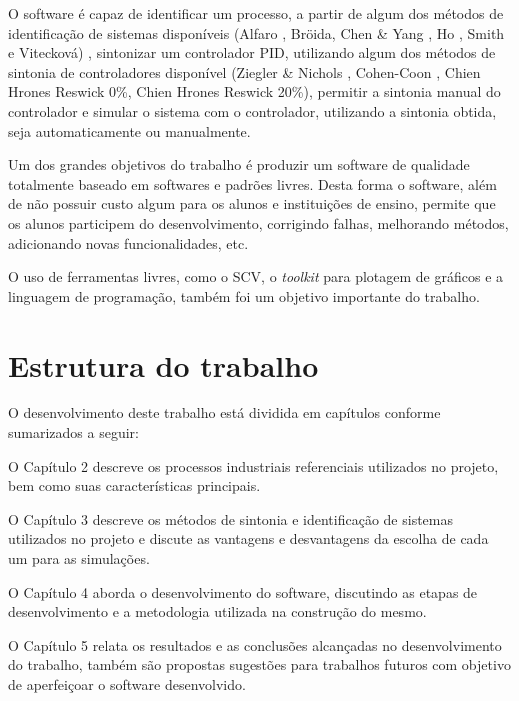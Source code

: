     O software é capaz de identificar um processo, a partir de algum dos
    métodos de identificação de sistemas disponíveis (Alfaro \cite{Alfaro2}, Bröida,
    Chen \& Yang \cite{ChenYang}, Ho \cite{Ho}, Smith \cite{Smith} e Vitecková)
    \cite{Viteckova}, sintonizar um controlador \acs{PID},
    utilizando algum dos métodos de sintonia de controladores disponível (Ziegler
    \& Nichols \cite{ZieglerNicholsAsme}, Cohen-Coon \cite{CohenCoon},
    Chien Hrones Reswick 0\%, Chien Hrones Reswick 20\%),
    permitir a sintonia manual do controlador e simular o sistema com o controlador,
    utilizando a sintonia obtida, seja automaticamente ou manualmente.
    
    Um dos grandes objetivos do trabalho é produzir um software de qualidade 
    totalmente baseado em softwares e padrões livres. Desta forma o software,
    além de não possuir custo algum para os alunos e instituições de ensino, permite
    que os alunos participem do desenvolvimento, corrigindo falhas, melhorando
    métodos, adicionando novas funcionalidades, etc.
    
    O uso de ferramentas livres, como o \ac{SCV}, o \textit{toolkit} para plotagem
    de gráficos e a linguagem de programação, também foi um objetivo importante do trabalho.

\section{Estrutura do trabalho}

    O desenvolvimento deste trabalho está dividida em capítulos conforme sumarizados
    a seguir:

    O Capítulo 2 descreve os processos industriais referenciais utilizados no projeto,
    bem como suas características principais.
    
    O Capítulo 3 descreve os métodos de sintonia e identificação de sistemas utilizados
    no projeto e discute as vantagens e desvantagens da escolha de cada um para as
    simulações.
    
    O Capítulo 4 aborda o desenvolvimento do software, discutindo as etapas de
    desenvolvimento e a metodologia utilizada na construção do mesmo.
    
    O Capítulo 5 relata os resultados e as conclusões alcançadas no desenvolvimento do
    trabalho, também são propostas sugestões para trabalhos futuros com objetivo de
    aperfeiçoar o software desenvolvido.
